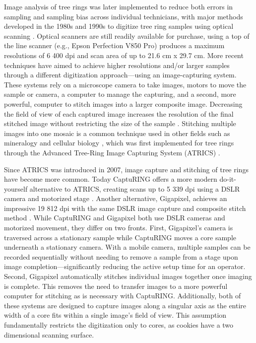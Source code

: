 \documentclass[a4paper,12pt]{article}
\begin{document}
Image analysis of tree rings was later implemented to reduce both errors in sampling and sampling bias across individual technicians, with major methods developed in the 1980s and 1990s to digitize tree ring samples using optical scanning \citep{mcmillin_application_1982,guay_new_1992}. Optical scanners are still readily available for purchase, using a top of the line scanner (e.g., Epson Perfection V850 Pro) produces a maximum resolutions of 6 400 dpi and scan area of up to 21.6 cm x 29.7 cm.
More recent techniques have aimed to achieve higher resolutions and/or larger samples through a different digitization approach---using an image-capturing system. These systems rely on a microscope camera to take images, motors to move the sample or camera, a computer to manage the capturing, and a second, more powerful, computer to stitch images into a larger composite image.
Decreasing the field of view of each captured image increases the resolution of the final stitched image without restricting the size of the sample \citep{muhlich_stitching_2022}.
Stitching multiple images into one mosaic is a common technique used in other fields such as mineralogy and cellular biology \citep{ro_image_2021,mohammadi_fast_2024}, which was
first implemented for tree rings through the Advanced Tree-Ring Image Capturing System (ATRICS) \citep{levanic_atrics_2007}. %

Since ATRICS was introduced in 2007, image capture and stitching of tree rings have become more common. Today CaptuRING offers a more modern do-it-yourself alternative to ATRICS, creating scans up to 5 339 dpi using a DSLR camera and motorized stage \citep{garcia-hidalgo_capturing_2022}. 
Another alternative, Gigapixel, achieves an impressive 19 812 dpi with the same DSLR image capture and composite stitch method \citep{griffin_gigapixel_2021}. 
While CaptuRING and Gigapixel both use DSLR cameras and motorized movement, they differ on two fronts. 
First, Gigapixel's camera is traversed across a stationary sample while CaptuRING moves a core sample underneath a stationary camera.
With a mobile camera, multiple samples can be recorded sequentially without needing to remove a sample from a stage upon image completion---significantly reducing the active setup time for an operator. 
Second, Gigapixel automatically stitches individual images together once imaging is complete. This removes the need to transfer images to a more powerful computer for stitching as is necessary with CaptuRING.
Additionally, both of these systems are designed to capture images along a singular axis as the entire width of a core fits within a single image's field of view.
This assumption fundamentally restricts the digitization only to cores, as cookies have a two dimensional scanning surface. %
\end{document}
